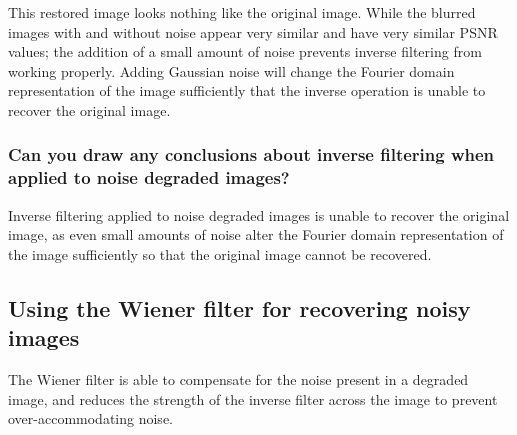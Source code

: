 \documentclass[article, 1.5space, letterpaper, 12pt, oneside, header, footer]{SydeClass}
\begin{document}
This restored image looks nothing like the original image. While the blurred images with and without noise appear very similar and have very similar PSNR values; the addition of a small amount of noise prevents inverse filtering from working properly. Adding Gaussian noise will change the Fourier domain representation of the image sufficiently that the inverse operation is unable to recover the original image.

\subsubsection{Can you draw any conclusions about inverse filtering when applied to noise degraded images?}

Inverse filtering applied to noise degraded images is unable to recover the original image, as even small amounts of noise alter the Fourier domain representation of the image sufficiently so that the original image cannot be recovered.


\subsection{Using the Wiener filter for recovering noisy images}

The Wiener filter is able to compensate for the noise present in a degraded image, and reduces the strength of the inverse filter across the image to prevent over-accommodating noise.
\end{document}
